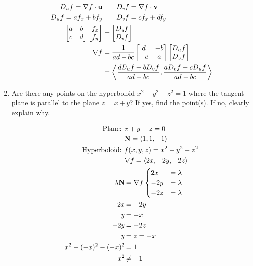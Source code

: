 \documentclass[11pt]{article}
\renewcommand{\vec}[1]{\ensuremath\mathbf{#1}}
\begin{document}
\begin{enumerate}
  \begin{align*}
    D_uf = \nabla f \cdot \vec{u} &\qquad D_vf = \nabla f \cdot \vec{v} \\
    D_uf = a f_x + b f_y &\qquad D_vf = c f_x + d f_y \\
    \begin{bmatrix}
      a & b \\
      c & d \\
    \end{bmatrix}
    \begin{bmatrix}
      f_x \\ f_y
    \end{bmatrix}
    &=
      \begin{bmatrix}
        D_uf \\ D_v f
      \end{bmatrix} \\
    \nabla f
    &=
      \frac{1}{ad - bc}
      \begin{bmatrix}
        d & -b \\
        -c & a \\
      \end{bmatrix}
      \begin{bmatrix}
        D_uf \\ D_v f
      \end{bmatrix} \\
    &= \left< \frac{d D_uf - b D_vf}{ad - bc}, \frac{a D_vf - c D_uf}{ad - bc} \right>
  \end{align*}

\item Are there any points on the hyperboloid \(x^2 - y^2 - z^2 = 1\) where
  the tangent plane is parallel to the plane \(z = x + y\)? If yes, find
  the point(s). If no, clearly explain why.

  \begin{align*}
    \text{Plane: }& x + y - z = 0 \\
                  &\vec{N} = \left< 1, 1, -1 \right> \\
    \text{Hyperboloid: }& f(x, y, z) = x^2 - y^2 - z^2 \\
                  &\nabla f = \left< 2x, -2y, -2z \right> \\
    \lambda\vec{N} &= \nabla f
                     \begin{cases}
                       2x &= \lambda \\
                       -2y &= \lambda \\
                       -2z &= \lambda
                     \end{cases} \\
    2x &= -2y \\
    y &= -x \\
    -2y &= -2z \\
    y &= z = -x \\
    x^2 - (-x)^2 - (-x)^2 &= 1 \\
    x^2 &\neq -1
  \end{align*}


\end{enumerate}
\end{document}
